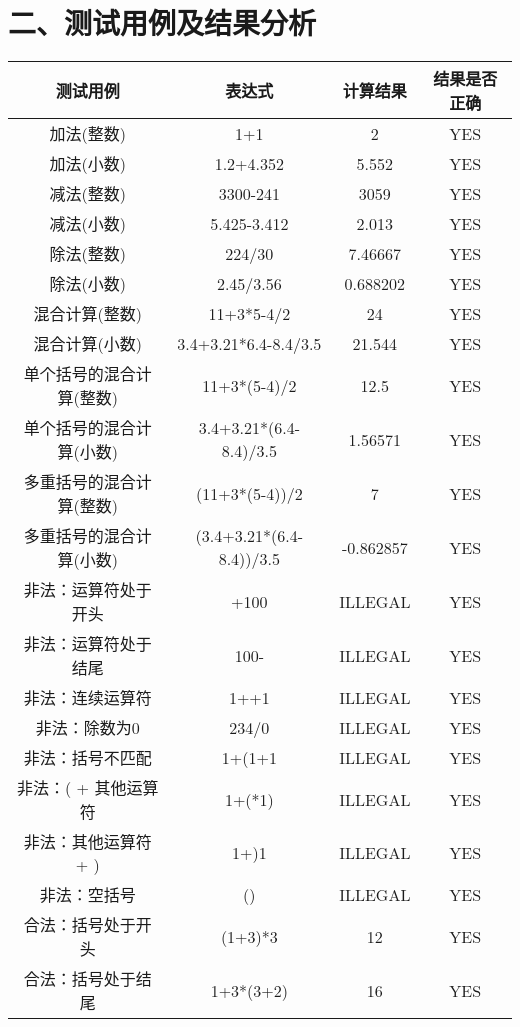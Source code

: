 \documentclass[a4paper]{article}
\begin{document}
\section*{二、测试用例及结果分析}
\renewcommand{\arraystretch}{2}
\begin{center}
\begin{tabular}{|c|c|c|c|}
\hline
测试用例 & 表达式 & 计算结果 & 结果是否正确 \\
\hline
加法(整数) & 1+1 & 2 & YES \\
\hline
加法(小数) & 1.2+4.352 & 5.552 & YES\\
\hline
减法(整数) & 3300-241 & 3059 & YES \\
\hline
减法(小数) & 5.425-3.412 & 2.013 & YES\\
\hline
除法(整数) & 224/30 & 7.46667 & YES \\
\hline
除法(小数) & 2.45/3.56 & 0.688202 & YES\\
\hline
混合计算(整数) & 11+3*5-4/2 & 24 & YES \\
\hline
混合计算(小数) & 3.4+3.21*6.4-8.4/3.5 & 21.544 & YES\\
\hline
单个括号的混合计算(整数) & 11+3*(5-4)/2 & 12.5 & YES \\
\hline
单个括号的混合计算(小数) & 3.4+3.21*(6.4-8.4)/3.5 & 1.56571 & YES\\
\hline
多重括号的混合计算(整数) & (11+3*(5-4))/2 & 7 & YES \\
\hline
多重括号的混合计算(小数) & (3.4+3.21*(6.4-8.4))/3.5 & -0.862857 & YES\\
\hline
非法：运算符处于开头 & +100 & ILLEGAL & YES \\
\hline
非法：运算符处于结尾 & 100- & ILLEGAL & YES \\
\hline
非法：连续运算符 & 1++1 & ILLEGAL & YES \\
\hline
非法：除数为0 & 234/0 & ILLEGAL & YES \\
\hline
非法：括号不匹配 & 1+(1+1 & ILLEGAL & YES\\
\hline
非法：( + 其他运算符 & 1+(*1) & ILLEGAL & YES \\
\hline
非法：其他运算符 + ) & 1+)1 & ILLEGAL & YES\\
\hline
非法：空括号 & () & ILLEGAL & YES\\
\hline
合法：括号处于开头  & (1+3)*3 & 12 & YES\\
\hline
合法：括号处于结尾 & 1+3*(3+2) & 16 & YES \\
\hline
\end{tabular}
\end{center}
\end{document}
